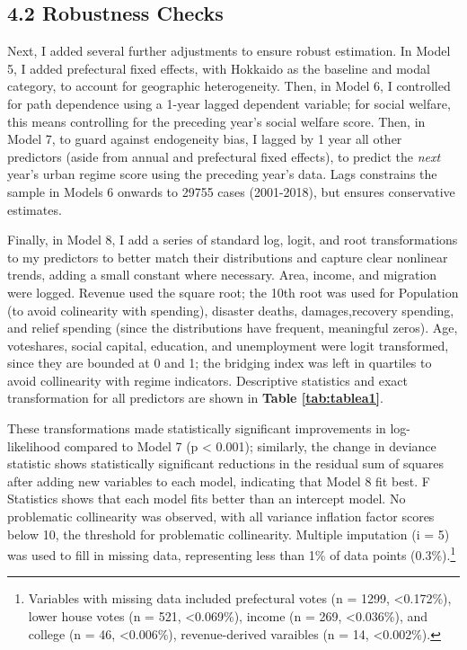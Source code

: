 \documentclass[preprint, 3p,
authoryear]{elsarticle} %
\begin{document}
\hypertarget{robustness-checks}{%
\subsection{4.2 Robustness Checks}\label{robustness-checks}}

Next, I added several further adjustments to ensure robust estimation.
In Model 5, I added prefectural fixed effects, with Hokkaido as the
baseline and modal category, to account for geographic heterogeneity.
Then, in Model 6, I controlled for path dependence using a 1-year lagged
dependent variable; for social welfare, this means controlling for the
preceding year's social welfare score. Then, in Model 7, to guard
against endogeneity bias, I lagged by 1 year all other predictors (aside
from annual and prefectural fixed effects), to predict the \emph{next}
year's urban regime score using the preceding year's data. Lags
constrains the sample in Models 6 onwards to 29755 cases (2001-2018),
but ensures conservative estimates.

Finally, in Model 8, I add a series of standard log, logit, and root
transformations to my predictors to better match their distributions and
capture clear nonlinear trends, adding a small constant where necessary.
Area, income, and migration were logged. Revenue used the square root;
the 10th root was used for Population (to avoid colinearity with
spending), disaster deaths, damages,recovery spending, and relief
spending (since the distributions have frequent, meaningful zeros). Age,
voteshares, social capital, education, and unemployment were logit
transformed, since they are bounded at 0 and 1; the bridging index was
left in quartiles to avoid collinearity with regime indicators.
Descriptive statistics and exact transformation for all predictors are
shown in \textbf{Table \ref{tab:tablea1}}.

These transformations made statistically significant improvements in
log-likelihood compared to Model 7 (p \textless{} 0.001); similarly, the
change in deviance statistic shows statistically significant reductions
in the residual sum of squares after adding new variables to each model,
indicating that Model 8 fit best. F Statistics shows that each model
fits better than an intercept model. No problematic collinearity was
observed, with all variance inflation factor scores below 10, the
threshold for problematic collinearity. Multiple imputation (i = 5) was
used to fill in missing data, representing less than 1\% of data points
(0.3\%).\footnote{Variables with missing data included prefectural votes
  (n = 1299, \textless0.172\%), lower house votes (n = 521,
  \textless0.069\%), income (n = 269, \textless0.036\%), and college (n
  = 46, \textless0.006\%), revenue-derived varaibles (n = 14,
  \textless0.002\%).}
\end{document}
